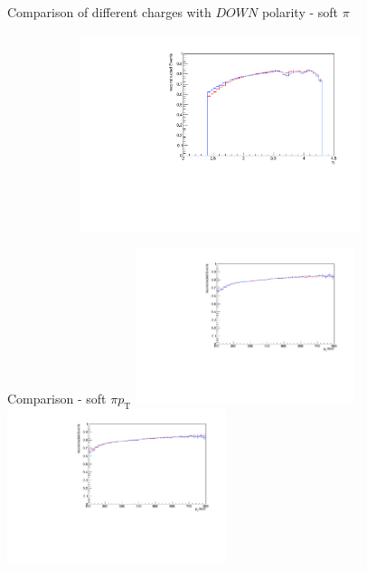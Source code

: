 \documentclass[11pt]{beamer}
\begin{document}
\begin{frame}{Comparison of different charges with $DOWN$ polarity - soft $\pi$}
\begin{figure}
\begin{subfigure}{0.45\textwidth}
\end{subfigure}
\begin{subfigure}{0.45\textwidth}
\includegraphics[width=0.9\textwidth]{fourth/down_pdf/combined/h_eta_reco_SPi.pdf}
\end{subfigure}
\end{figure}
\end{frame}
\begin{frame}{Comparison - soft $\pi p_\text{T}$}
\centering
\includegraphics[width=0.48\textwidth]{fourth/up_pdf/combined/h_pt_reco_SPi.pdf}
\includegraphics[width=0.48\textwidth]{fourth/down_pdf/combined/h_pt_reco_SPi.pdf}
\end{frame}
\end{document}
